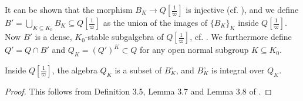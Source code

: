 \documentclass[../main.tex]{subfiles}
\begin{document}
It can be shown that the morphism $B_K \to Q[\tfrac 1\varpi]$ is injective
(cf. \cite[Lemma 3.4]{mieda2016geometric}), and we define $B' =
\bigcup_{K\subseteq K_0} B_K \subseteq Q[\tfrac 1\varpi]$ as the union
of the images of $\{B_K\}_K$ inside $Q[\tfrac 1\varpi]$. Now $B'$ 
is a dense, $K_0$-stable subgalgebra of $Q[\tfrac 1\varpi]$, cf.
\cite[Proposition 4.5]{mieda2016geometric}. We furthermore define
$Q' = Q \cap B'$ and $Q_K = (Q')^K \subset Q$ for any open normal subgroup $K
\subseteq K_0$. 

\begin{lem}\label{lem:BKisIntegralOverQK}
  Inside $Q[\tfrac 1\varpi]$, the algebra $Q_K$ is a subset of $B_K^\circ$,
  and $B_K^\circ$ is integral over $Q_K$. 
\begin{proof}
  This follows from Definition 3.5, Lemma 3.7 and Lemma 3.8 of \cite{mieda2016geometric}. 
\end{proof}
\end{lem}
\end{document}
